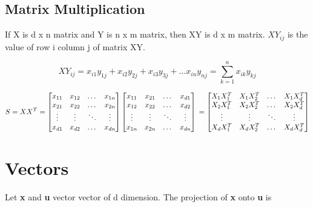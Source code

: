 \documentclass{article}
\begin{document}
\subsection{Matrix Multiplication}
If X is d x n matrix and Y is n x m matrix, then XY is d x m matrix. $XY_{ij}$ is the value of row i column j of matrix XY.

$$XY_{ij} = x_{i1}y_{1j} + x_{i2}y_{2j} + x_{i3}y_{3j} + \dots x_{in}y_{nj} = \sum_{k=1}^{n}x_{ik}y_{kj}$$

$$
S
= XX^T
=
\begin{bmatrix}
  x_{11} & x_{12} & \dots & x_{1n} \\
  x_{21} & x_{22} & \dots & x_{2n} \\
  \vdots & \vdots & \ddots & \vdots \\
  x_{d1} & x_{d2} & \dots & x_{dn} \\
\end{bmatrix}
\begin{bmatrix}
  x_{11} & x_{21} & \dots & x_{d1} \\
  x_{12} & x_{22} & \dots & x_{d2} \\
  \vdots & \vdots & \ddots & \vdots \\
  x_{1n} & x_{2n} & \dots & x_{dn} \\
\end{bmatrix}
\\
=
\begin{bmatrix}
  X_{1}X_{1}^T & X_{1}X_{2}^T & \dots & X_{1}X_{d}^T \\
  X_{2}X_{1}^T & X_{2}X_{2}^T & \dots & X_{2}X_{d}^T \\  
  \vdots & \vdots  & \ddots & \vdots \\
  X_{d}X_{1}^T & X_{d}X_{2}^T & \dots & X_{d}X_{d}^T \\  
\end{bmatrix}
$$

\section{Vectors}
Let \textbf{x} and \textbf{u} vector vector of d dimension. The projection of \textbf{x} onto \textbf{u} is
\end{document}
